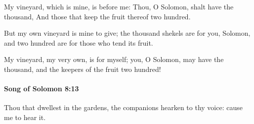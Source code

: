			\begin{versebox}
					\item[BHS] 
					\item[LXX] 
					\item[ASV] My vineyard, which is mine, is before me: Thou, O Solomon, shalt have the thousand, And those that keep the fruit thereof two hundred.
					\item[NIV] But my own vineyard is mine to give; the thousand shekels are for you, Solomon, and two hundred are for those who tend its fruit.
					\item[NRSV] My vineyard, my very own, is for myself; you, O Solomon, may have the thousand, and the keepers of the fruit two hundred!
			\end{versebox}

		\paragraph{Song of Solomon 8:13} %
			\label{SONGOFSOLOMON-8-13}

			Thou that dwellest in the gardens, the companions hearken to thy voice: cause me to hear it.

